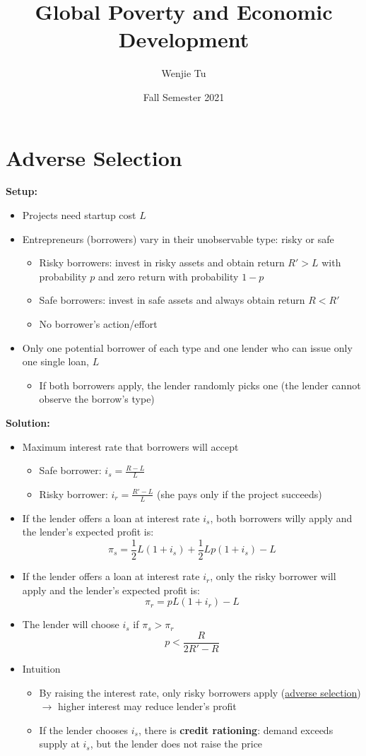 \documentclass[a4paper]{article}
\title{%
     Global Poverty and Economic Development
}
\author{Wenjie Tu}
\date{Fall Semester 2021}
\begin{document}
\maketitle

\section{Adverse Selection}
\textbf{Setup:}
\begin{itemize}
    \item Projects need startup cost $L$
    \item Entrepreneurs (borrowers) vary in their unobservable type: risky or safe
    \begin{itemize}
        \item Risky borrowers: invest in risky assets and obtain return $R'>L$ with probability $p$ and zero return with probability $1-p$
        \item Safe borrowers: invest in safe assets and always obtain return $R<R'$
        \item No borrower's action/effort
    \end{itemize}
    \item Only one potential borrower of each type and one lender who can issue only one single loan, $L$
    \begin{itemize}
        \item If both borrowers apply, the lender randomly picks one (the lender cannot observe the borrow's type)
    \end{itemize}
\end{itemize}
\textbf{Solution:}
\begin{itemize}
    \item Maximum interest rate that borrowers will accept
    \begin{itemize}
        \item Safe borrower: $i_s=\frac{R-L}{L}$
        \item Risky borrower: $i_r=\frac{R'-L}{L}$ (she pays only if the project succeeds)
    \end{itemize}
    \item If the lender offers a loan at interest rate $i_s$, both borrowers willy apply and the lender's expected profit is:
    \[\pi_s=\frac{1}{2}L(1+i_s)+\frac{1}{2}Lp(1+i_s)-L \]
    \item If the lender offers a loan at interest rate $i_r$, only the risky borrower will apply and the lender's expected profit is:
    \[\pi_r=pL(1+i_r)-L \]
    \item The lender will choose $i_s$ if $\pi_s>\pi_r$
    \[p<\frac{R}{2R'-R} \]
    \item Intuition
    \begin{itemize}
        \item By raising the interest rate, only risky borrowers apply (\underline{adverse selection}) $\to$ higher interest may reduce lender's profit
        \item If the lender chooses $i_s$, there is \textbf{credit rationing}: demand exceeds supply at $i_s$, but the lender does not raise the price
    \end{itemize}
\end{itemize}
\end{document}
